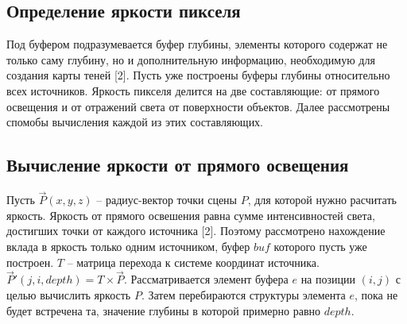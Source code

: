 {    \subsection{Определение яркости пикселя} {
        Под буфером подразумевается буфер глубины, элементы которого содержат не только
        саму глубину, но и дополнительную информацию,
        необходимую для создания карты теней [2].
        Пусть уже построены буферы глубины относительно всех источников.
        Яркость пикселя делится на две составляющие: от прямого освещения и от
        отражений света от поверхности объектов.
        Далее рассмотрены спомобы вычисления каждой из этих составляющих.
        \subsection{Вычисление яркости от прямого освещения} {
            Пусть $\vec{P}(x, y, z)$ -- радиус-вектор точки сцены $P$,
            для которой нужно расчитать яркость.
            Яркость от прямого освешения равна сумме интенсивностей света, достигших
            точки от каждого источника [2].
            Поэтому рассмотрено нахождение вклада в яркость только одним источником,
            буфер $buf$ которого пусть уже построен.
            $T$ -- матрица перехода к системе координат источника.
            $\vec{P}'(j, i, depth) = T \times \vec{P}$.
            Рассматривается элемент буфера $e$ на позиции $(i, j)$
            с целью вычислить яркость $P$.
            Затем перебираются структуры элемента $e$, пока не будет встречена та,
            значение глубины в которой примерно равно $depth$.
        }
}}
